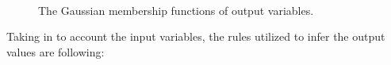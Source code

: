 \begin{figure}[ht!]
   \captionsetup{font=footnotesize}
   \centering
        \hspace{0.1\linewidth}
    \\
   \caption{The Gaussian membership functions of output variables.
   }
   \label{fig:fis-outputs} 
\end{figure}
Taking in to account the input variables, the rules utilized to infer the 
output values are following:
